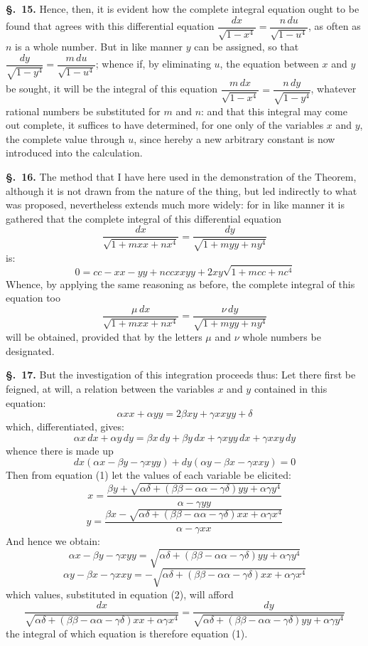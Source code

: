 \documentclass{article}
\begin{document}
\textbf{§.~15.} Hence, then, it is evident how the complete integral equation ought to be found that
agrees with this differential equation
$\dfrac{dx}{\sqrt{1-x^{4}}} = \dfrac{n\,du}{\sqrt{1-u^{4}}}$, as often as $n$ is a whole number. But in
like manner $y$ can be assigned, so that
$\dfrac{dy}{\sqrt{1-y^{4}}} = \dfrac{m\,du}{\sqrt{1-u^{4}}}$; whence if, by eliminating $u$, the
equation between $x$ and $y$ be sought, it will be the integral of this equation
$\dfrac{m\,dx}{\sqrt{1-x^{4}}} = \dfrac{n\,dy}{\sqrt{1-y^{4}}}$, whatever rational numbers be
substituted for $m$ and $n$: and that this integral may come out complete, it suffices to have
determined, for one only of the variables $x$ and $y$, the complete value through $u$, since hereby a
new arbitrary constant is now introduced into the calculation.

\textbf{§.~16.} The method that I have here used in the demonstration of the Theorem, although it is
not drawn from the nature of the thing, but led indirectly to what was proposed, nevertheless
extends much more widely: for in like manner it is gathered that the complete integral of this
differential equation
\[ \frac{dx}{\sqrt{1+mxx+nx^{4}}} = \frac{dy}{\sqrt{1+myy+ny^{4}}} \]
is:
\[ 0 = cc - xx - yy + nccxxyy + 2xy\sqrt{1+mcc+nc^{4}} \]
Whence, by applying the same reasoning as before, the complete integral of this equation too
\[ \frac{\mu\,dx}{\sqrt{1+mxx+nx^{4}}} = \frac{\nu\,dy}{\sqrt{1+myy+ny^{4}}} \]
will be obtained, provided that by the letters $\mu$ and $\nu$ whole numbers be designated.

\textbf{§.~17.} But the investigation of this integration proceeds thus: Let there first be feigned,
at will, a relation between the variables $x$ and $y$ contained in this equation:
\[ \alpha xx + \alpha yy = 2\beta xy + \gamma xxyy + \delta \tag{1} \]
which, differentiated, gives:
\[ \alpha x\,dx + \alpha y\,dy = \beta x\,dy + \beta y\,dx + \gamma xyy\,dx + \gamma xxy\,dy \]
whence there is made up
\[ dx(\alpha x - \beta y - \gamma xyy) + dy(\alpha y - \beta x - \gamma xxy) = 0 \tag{2} \]
Then from equation (1) let the values of each variable be elicited:
\[ x = \frac{\beta y + \sqrt{\alpha\delta + (\beta\beta - \alpha\alpha - \gamma\delta)yy + \alpha\gamma y^{4}}}{\alpha - \gamma yy} \]
\[ y = \frac{\beta x - \sqrt{\alpha\delta + (\beta\beta - \alpha\alpha - \gamma\delta)xx + \alpha\gamma x^{4}}}{\alpha - \gamma xx} \]
And hence we obtain:
\[ \alpha x - \beta y - \gamma xyy = \sqrt{\alpha\delta + (\beta\beta - \alpha\alpha - \gamma\delta)yy + \alpha\gamma y^{4}} \tag{3} \]
\[ \alpha y - \beta x - \gamma xxy = -\sqrt{\alpha\delta + (\beta\beta - \alpha\alpha - \gamma\delta)xx + \alpha\gamma x^{4}} \tag{4} \]
which values, substituted in equation (2), will afford
\[ \frac{dx}{\sqrt{\alpha\delta + (\beta\beta - \alpha\alpha - \gamma\delta)xx + \alpha\gamma x^{4}}}
   = \frac{dy}{\sqrt{\alpha\delta + (\beta\beta - \alpha\alpha - \gamma\delta)yy + \alpha\gamma y^{4}}} \tag{5} \]
the integral of which equation is therefore equation (1).
\end{document}
